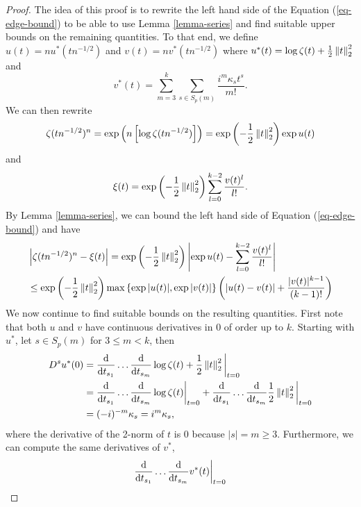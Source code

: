 \begin{proof}
    The idea of this proof is to rewrite the left hand side of the Equation (\ref{eq-edge-bound}) to be able to use Lemma \ref{lemma-series} and find suitable upper bounds on the remaining quantities. To that end, we define $u(t) = n u^*(t n^{-1/2})$ and $v(t) = nv^*(t n^{-1/2})$ where $u^*(t) = \log \zeta(t) + \frac{1}{2}\left\lVert t\right\rVert_2^2$ and 
    \begin{equation*}
        v^*(t) = \sum_{m=3}^k \sum_{s \in S_p(m)} \frac{i^m\kappa_s t^s}{m!}.
    \end{equation*}
    We can then rewrite
    \begin{equation*}
        \zeta(t n^{-1/2})^n = \exp\left(n\left[\log \zeta(t n^{-1/2})\right]\right) = \exp\left(-\frac{1}{2}\left\lVert t\right\rVert_2^2\right)\exp u(t)
    \end{equation*}
    and
    \begin{equation*}
        \xi(t) = \exp\left(-\frac{1}{2}\left\lVert t\right\rVert_2^2\right)\sum_{l=0}^{k-2} \frac{v(t)^l}{l!}.
    \end{equation*}
    By Lemma \ref{lemma-series}, we can bound the left hand side of Equation (\ref{eq-edge-bound}) and have
    \begin{align*}
        &\left|\zeta(t n^{-1/2})^n - \xi(t)\right| 
        = \exp\left(-\frac{1}{2}\left\lVert t\right\rVert_2^2\right)\left|\exp u(t) - \sum_{l=0}^{k-2} \frac{v(t)^l}{l!}\right|\\
        &\leq \exp\left(-\frac{1}{2}\left\lVert t\right\rVert_2^2\right) \max \left\{ \exp{|u(t)|}, \exp{|v(t)|} \right\}\left(\left|u(t) - v(t)\right| + \frac{|v(t)|^{k-1}}{(k-1)!}\right)
    \end{align*}
    We now continue to find suitable bounds on the resulting quantities. First note that both $u$ and $v$ have continuous derivatives in 0 of order up to $k$. Starting with $u^*$, let $s \in S_p(m)$ for $3 \leq m < k$, then
    \begin{align*}
        D^s u^*(0)
        &= \frac{\text{d}}{\text{d} t_{s_1}}\ldots\frac{\text{d}}{\text{d} t_{s_m}} \log \zeta(t) + \frac{1}{2}\left\lVert t\right\rVert_2^2\bigg|_{t=0}\\
        &=  \frac{\text{d}}{\text{d} t_{s_1}}\ldots\frac{\text{d}}{\text{d} t_{s_m}} \log \zeta(t)\bigg|_{t=0}
            +
            \frac{\text{d}}{\text{d} t_{s_1}}\ldots\frac{\text{d}}{\text{d} t_{s_m}} \frac{1}{2}\left\lVert t\right\rVert_2^2\bigg|_{t=0}
        \\
        &= (-i)^{-m}\kappa_s = i^m \kappa_s ,
    \end{align*}
    where the derivative of the 2-norm of $t$ is 0 because $|s| = m \geq 3$. Furthermore, we can compute the same derivatives of $v^*$,
    \begin{align*}
        \ddx{t_{s_1}}\ldots\ddx{t_{s_m}} v^*(t) \bigg|_{t=0}

\end{align*}
\end{proof}
